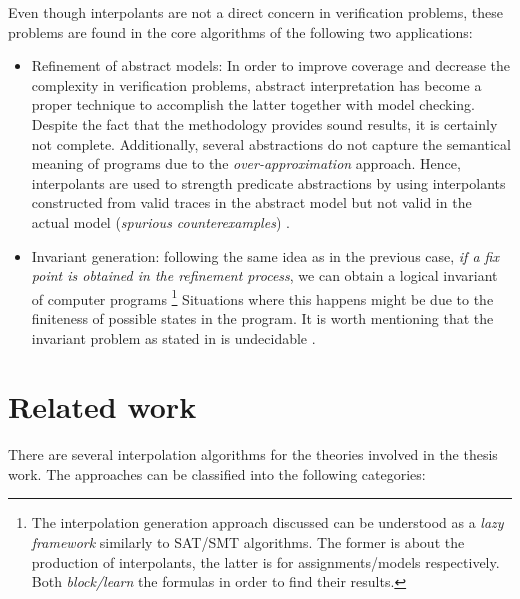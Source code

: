Even though interpolants are not a direct concern in verification
problems, these problems are found in the core algorithms of the 
following two applications:

\begin{itemize}
  \item Refinement of abstract models: In order to improve 
    coverage and decrease the complexity in verification problems,
    abstract interpretation has become a proper technique to 
    accomplish the latter together with model checking. Despite the fact that 
    the methodology provides sound results, it is certainly not complete.
    Additionally, several abstractions do not capture the semantical
    meaning of programs due to the \emph{over-approximation} approach.
    Hence, interpolants are used to strength predicate
    abstractions by using interpolants constructed from valid 
    traces in the abstract model but not valid in the actual model
    (\emph{spurious counterexamples}) \cite{10.1145/876638.876643,
    10.1007/978-3-540-45069-6_1, 10.1145/982962.964021}.
  \item Invariant generation: following the same idea as in the previous
    case, \emph{if a fix point is obtained in the refinement process},
    we can obtain a logical invariant of computer programs 
    \footnote{The interpolation
      generation approach discussed can be understood as a \emph{lazy framework}
      similarly to SAT/SMT algorithms. The former is
      about the production of interpolants, the latter is for 
      assignments/models respectively. Both \emph{block/learn} the formulas
    in order to find their results.}
    Situations where this happens might be due to the finiteness of possible 
    states in the program. It is worth mentioning that the 
    invariant problem as stated in \cite{10.1145/363235.363259} 
    is undecidable \cite{10.2307/1990888, 10.1145/371282.371285}.
\end{itemize}

\section{Related work}

There are several interpolation algorithms for the theories
involved in the thesis work. The approaches can be classified
into the following categories:

